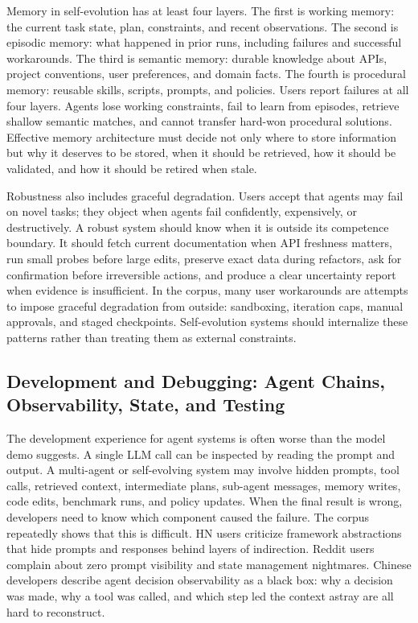 Memory in self-evolution has at least four layers. The first is working memory: the current task state, plan, constraints, and recent observations. The second is episodic memory: what happened in prior runs, including failures and successful workarounds. The third is semantic memory: durable knowledge about APIs, project conventions, user preferences, and domain facts. The fourth is procedural memory: reusable skills, scripts, prompts, and policies. Users report failures at all four layers. Agents lose working constraints, fail to learn from episodes, retrieve shallow semantic matches, and cannot transfer hard-won procedural solutions. Effective memory architecture must decide not only where to store information but why it deserves to be stored, when it should be retrieved, how it should be validated, and how it should be retired when stale.

Robustness also includes graceful degradation. Users accept that agents may fail on novel tasks; they object when agents fail confidently, expensively, or destructively. A robust system should know when it is outside its competence boundary. It should fetch current documentation when API freshness matters, run small probes before large edits, preserve exact data during refactors, ask for confirmation before irreversible actions, and produce a clear uncertainty report when evidence is insufficient. In the corpus, many user workarounds are attempts to impose graceful degradation from outside: sandboxing, iteration caps, manual approvals, and staged checkpoints. Self-evolution systems should internalize these patterns rather than treating them as external constraints.

\subsection{Development and Debugging: Agent Chains, Observability, State, and Testing}
\label{subsec:development-debugging}

The development experience for agent systems is often worse than the model demo suggests. A single LLM call can be inspected by reading the prompt and output. A multi-agent or self-evolving system may involve hidden prompts, tool calls, retrieved context, intermediate plans, sub-agent messages, memory writes, code edits, benchmark runs, and policy updates. When the final result is wrong, developers need to know which component caused the failure. The corpus repeatedly shows that this is difficult. HN users criticize framework abstractions that hide prompts and responses behind layers of indirection. Reddit users complain about zero prompt visibility and state management nightmares. Chinese developers describe agent decision observability as a black box: why a decision was made, why a tool was called, and which step led the context astray are all hard to reconstruct.

